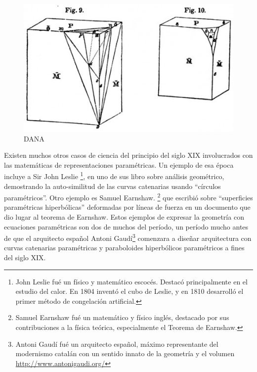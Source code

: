 \begin{figure}
\centering
\includegraphics[width=12cm]{Img/CPD/5-DANA.jpg}
\caption[(optional short caption)]{\label{us_figure} DANA}
\end{figure}


Existen muchos otros casos de ciencia del principio del siglo XIX involucrados con las matemáticas de representaciones paramétricas. Un ejemplo de esa época incluye a Sir John Leslie \footnote{John Leslie fué un físico y matemático escocés. Destacó principalmente en el estudio del calor. En 1804 inventó el cubo de Leslie, y en 1810 desarrolló el primer método de congelación artificial.}, en uno de sus libro sobre análisis geométrico, demostrando la auto-similitud de las curvas catenarias usando ``círculos paramétricos''. Otro ejemplo es Samuel Earnshaw. \footnote{Samuel Earnshaw fué un matemático y físico inglés, destacado por sus contribuciones a la física teórica, especialmente el Teorema de Earnshaw.} que escribió sobre ``superficies paramétricas hiperbólicas'' deformadas por líneas de fuerza en un documento que dio lugar al teorema de Earnshaw. Estos ejemplos de expresar la geometría con ecuaciones paramétricas son dos de muchos del período, un período mucho antes de que el arquitecto español Antoni Gaudí\footnote{Antoni Gaudí fué un arquitecto español, máximo representante del modernismo catalán con un sentido innato de la geometría y el volumen \url{http://www.antonigaudi.org/} } comenzara a diseñar arquitectura con curvas catenarias paramétricas y paraboloides hiperbólicos paramétricos a fines del siglo XIX.

